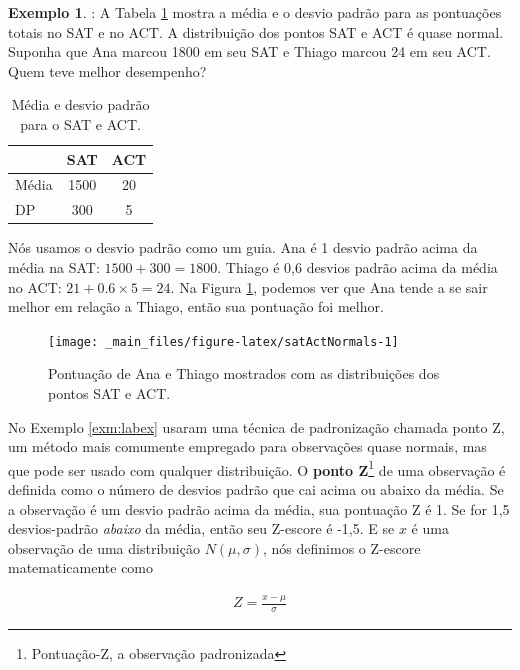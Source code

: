 \documentclass[
]{book}
\theoremstyle{definition}
\theoremstyle{definition}
\newtheorem{example}{Exemplo}[chapter]
\theoremstyle{definition}
\theoremstyle{definition}
\theoremstyle{remark}
\begin{document}
\begin{example}
\protect\hypertarget{exm:labex}{}{\label{exm:labex} }: A Tabela \ref{tab:satACTstats} mostra a média e o desvio padrão para as pontuações totais no SAT e no ACT. A distribuição dos pontos SAT e ACT é quase normal. Suponha que Ana marcou 1800 em seu SAT e Thiago marcou 24 em seu ACT. Quem teve melhor desempenho?
\end{example}

\begin{table}

\caption{\label{tab:satACTstats}Média e desvio padrão para o SAT e ACT.}
\centering
\begin{tabular}[t]{l|c|c}
\hline
  & SAT & ACT\\
\hline
Média & 1500 & 20\\
\hline
DP & 300 & 5\\
\hline
\end{tabular}
\end{table}

Nós usamos o desvio padrão como um guia. Ana é 1 desvio padrão acima da média na SAT: \(1500 + 300=1800\). Thiago é 0,6 desvios padrão acima da média no ACT: \(21+0.6\times 5=24\). Na Figura \ref{fig:satActNormals}, podemos ver que Ana tende a se sair melhor em relação a Thiago, então sua pontuação foi melhor.

\begin{figure}

{\centering \texttt{[image: \_main\_files/figure-latex/satActNormals-1]} 

}

\caption{Pontuação de Ana e Thiago mostrados com as distribuições dos pontos SAT e ACT.}\label{fig:satActNormals}
\end{figure}

No Exemplo \ref{exm:labex} usaram uma técnica de padronização chamada ponto Z, um método mais comumente empregado para observações quase normais, mas que pode ser usado com qualquer distribuição. O \textbf{ponto Z}\footnote{Pontuação-Z, a observação padronizada} de uma observação é definida como o número de desvios padrão que cai acima ou abaixo da média. Se a observação é um desvio padrão acima da média, sua pontuação Z é 1. Se for 1,5 desvios-padrão \emph{abaixo} da média, então seu Z-escore é -1,5. E se \(x\) é uma observação de uma distribuição \(N(\mu, \sigma)\), nós definimos o Z-escore matematicamente como

\begin{eqnarray*}
Z = \frac{x-\mu}{\sigma}
\end{eqnarray*}
\end{document}
